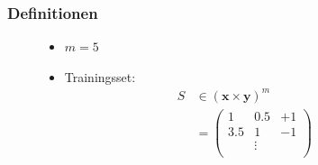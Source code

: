 \begin{frame}
    \frametitle{Definitionen}

    \begin{figure}[h]
        \begin{minipage}{0.4\textwidth} 
            \begin{figure}[h]
            \end{figure}
        \end{minipage}
        \hfill
        \begin{minipage}{0.4\textwidth}
            \begin{itemize}
                \item<2-> $m = 5$
                \item<2-> Trainingsset:
                    \begin{align*}
                        S &\in (\boldsymbol{x} \times \boldsymbol{y})^m \\
                        &=  \left( \begin{matrix}
                            1 & 0.5 & +1 \\
                            3.5 & 1 & -1 \\
                            & \vdots & \\
                        \end{matrix} \right) \\
                    \end{align*}
            \end{itemize} 
        \end{minipage}
    \end{figure}
    

\end{frame}
